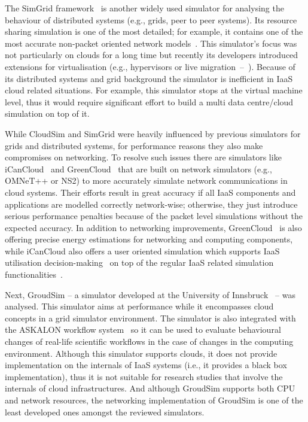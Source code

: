 \documentclass[sort, compress, 5p]{elsarticle}
\begin{document}
The SimGrid framework~\cite{SimGrid-casanova2001simgrid} is another widely used simulator for analysing the behaviour of distributed systems (e.g., grids, peer to peer systems). Its resource sharing simulation is one of the most detailed; for example, it contains one of the most accurate non-packet oriented network models~\cite{SimGrid-velho2009accuracy,SimGrid-velho2013validity}. This simulator's focus was not particularly on clouds for a long time but recently its developers introduced extensions for virtualisation (e.g., hypervisors or live migration~--~\cite{SimGrid-hirofuchi2013adding,SimGrid-Hirofuchi2013}). Because of its distributed systems and grid background the simulator is inefficient in IaaS cloud related situations. For example, this simulator stops at the virtual machine level, thus it would require significant effort to build a multi data centre/cloud simulation on top of it.

While CloudSim and SimGrid were heavily influenced by previous simulators for grids and distributed systems, for performance reasons they also make compromises on networking. To resolve such issues there are simulators like iCanCloud~\cite{iCanCloud-Nunez2011} and GreenCloud~\cite{GreenCloud-5683561} that are built on network simulators (e.g., OMNeT++ or NS2) to more accurately simulate network communications in cloud systems. Their efforts result in great accuracy if all IaaS components and applications are modelled correctly network-wise; otherwise, they just introduce serious performance penalties because of the packet level simulations without the expected accuracy. In addition to networking improvements, GreenCloud~\cite{GreenCloud-kliazovich2012greencloud} is also offering precise energy estimations for networking and computing components, while iCanCloud also offers a user oriented simulation which supports IaaS utilisation decision-making~\cite{iCanCloud-nunez2011design} on top of the regular IaaS related simulation functionalities~\cite{iCanCloud-nunez2012icancloud}.

Next, GroudSim -- a simulator developed at the University of Innsbruck~\cite{GroudSim-ostermann2011groudsim} -- was analysed. This simulator aims at performance while it encompasses cloud concepts in a grid simulator environment. The simulator is also integrated with the ASKALON workflow system~\cite{GroudSim-ostermann2011integration} so it can be used to evaluate behavioural changes of real-life scientific workflows in the case of changes in the computing environment. Although this simulator supports clouds, it does not provide implementation on the internals of IaaS systems (i.e., it provides a black box implementation), thus it is not suitable for research studies that involve the internals of cloud infrastructures. And although GroudSim supports both CPU and network resources, the networking implementation of GroudSim is one of the least developed ones amongst the reviewed simulators.
\end{document}

